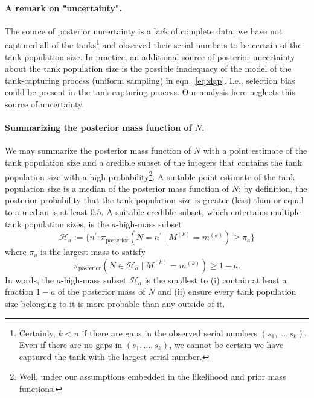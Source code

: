 \documentclass[11pt, oneside]{article}
\newcommand{\data}{$(s_1, ..., s_k)$\xspace}
\DeclareRobustCommand{\cms}[1]{ {\begingroup\sethlcolor{fruitpushorange}\hl{(cms:) #1}\endgroup} }
\begin{document}

\paragraph{A remark on "uncertainty".}
The source of posterior uncertainty is a lack of complete data: we have not captured all of the tanks\footnote{
Certainly, $k<n$ if there are gaps in the observed serial numbers \data. Even if there are no gaps in \data, we cannot be certain we have captured the tank with the largest serial number.
} and observed their serial numbers to be certain of the tank population size.
In practice, an additional source of posterior uncertainty about the tank population size is the possible inadequacy of the model of the tank-capturing process (uniform sampling) in eqn.~\ref{eq:dgp}. I.e., selection bias could be present in the tank-capturing process. Our analysis here neglects this source of uncertainty. 

\paragraph{Summarizing the posterior mass function of $N$.}
We may summarize the posterior mass function of $N$ with a point estimate of the tank population size and a credible subset of the integers that contains the tank population size with a high probability\footnote{Well, under our assumptions embedded in the likelihood and prior mass functions.}.
A suitable point estimate of the tank population size is a median of the posterior mass function of $N$; by definition, the posterior probability that the tank population size is greater (less) than or equal to a median is at least 0.5.
A suitable credible subset, which entertains multiple tank population sizes, is the $a$-high-mass subset \cite{hyndman1996computing}
\begin{equation}
	\mathcal{H}_a:= \{n^\prime : \pi_{\text{posterior}}(N=n^\prime \mid M^{(k)}=m^{(k)}) \geq \pi_a\}
\end{equation} where $\pi_a$ is the largest mass to satisfy 
\begin{equation}
	\pi_{\text{posterior}}(N \in \mathcal{H}_a \mid M^{(k)}=m^{(k)}) \geq 1 - a.
\end{equation}
In words, the $a$-high-mass subset $\mathcal{H}_a$ is the smallest to (i) contain at least a fraction $1-a$ of the posterior mass of $N$ and (ii) ensure every tank population size belonging to it is more probable than any outside of it. 
\end{document}
